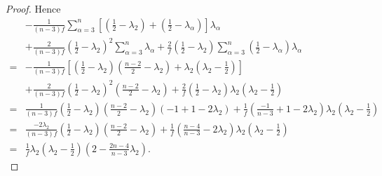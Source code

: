 \documentclass[12pt]{amsart}
\begin{document}
\begin{proof}
Hence
\begin{equation*}
	\begin{aligned}
		&-{\frac{1}{(n-3)f}}\sum_{\alpha=3}^n\left[ ({\frac{1}{2}}-\lambda_{2})+({\frac{1}{2}}-\lambda_{\alpha})\right] \lambda_\alpha\\	 &+\frac{2}{(n-3)f}(\frac{1}{2}-\lambda_{2})^2\sum_{\alpha=3}^n\lambda_{\alpha}+\frac{2}{f}({\frac{1}{2}}-\lambda_{2})\sum_{\alpha=3}^n({\frac{1}{2}}-\lambda_{\alpha})\lambda_{\alpha}\\
		 =&-\frac{1}{(n-3)f}\left[(\frac{1}{2}-\lambda_2)(\frac{n-2}{2}-\lambda_2)+\lambda_2(\lambda_2-\frac{1}{2})\right] \\
		  &+\frac{2}{(n-3)f}\left(\frac{1}{2}-\lambda_2\right)^2(\frac{n-2}{2}-\lambda_2)+\frac{2}{f}(\frac{1}{2}-\lambda_2)\lambda_2(\lambda_2-\frac{1}{2})\\
		 =&\frac{1}{(n-3)f}(\frac{1}{2}-\lambda_2)(\frac{n-2}{2}-\lambda_2)(-1+1-2\lambda_2)+\frac{1}{f}(\frac{-1}{n-3}+1-2\lambda_2)\lambda_2(\lambda_2-\frac{1}{2})\\
		 =&\frac{-2\lambda_2}{(n-3)f}(\frac{1}{2}-\lambda_2)(\frac{n-2}{2}-\lambda_2)+\frac{1}{f}(\frac{n-4}{n-3}-2\lambda_2)\lambda_2(\lambda_2-\frac{1}{2})\\
=&\frac{1}{f}\lambda_2(\lambda_2-\frac{1}{2})(2-\frac{2n-4}{n-3}\lambda_2).
	\end{aligned}
\end{equation*}



\end{proof}
\end{document}
